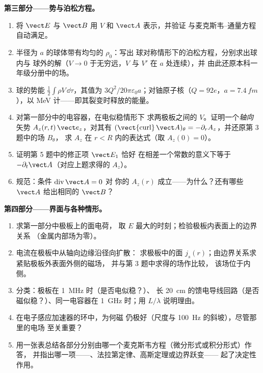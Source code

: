 \begin{problem}
\medskip
\noindent\textbf{第三部分——势与泊松方程。}
\begin{enumerate}[resume]
  \item 将 $\vect E$ 与 $\vect B$ 用 $V$ 和 $\vect A$ 表示，并验证
        与麦克斯韦–通量方程
        自动满足。
  \item 半径为 $a$ 的球体带有均匀的 $\rho_0$：写出
        球对称情形下的泊松方程，分别求出球内与
        球外的解（$V \to 0$ 于无穷远，$V$ 与 $V'$ 在 $a$ 处连续），并
        由此还原本科一年级分册中的场。
  \item 球的势能 $\tfrac12\int\rho V\,\dd\tau$，其值为
        $3Q^2/20\pi\varepsilon_0a$；对铀原子核（$Q = 92e$，$a =
        \qty{7.4}{fm}$），以 MeV 计——即其裂变时释放的能量。
  \item 对第一部分中的电容器，在电似稳情形下
        求两极板之间的 $V$。证明一个\emph{轴向}
        矢势 $A_z(r, t)\,\vect e_z$，对其有 $(\operatorname{\vect{curl}}
        \vect A)_\theta = -\partial_rA_z$，并还原第 3 题中的场 $B_\theta$，
        求 $A_z$ 在 $r < R$ 内的表达式（取 $A_z(0) = 0$）。
  \item 证明第 5 题中的修正项 $\vect E_1$ 恰好
        在相差一个常数的意义下等于 $-\partial_t\vect A$（对应上题求得的 $A_z$）。
  \item 规范：条件 $\operatorname{div}\vect A = 0$ 对
        你的 $A_z(r)$ 成立——为什么？还有哪些 $\vect A$ 给出相同的 $\vect B$？
\end{enumerate}

\medskip
\noindent\textbf{第四部分——界面与各种情形。}
\begin{enumerate}[resume]
  \item 求第一部分中极板上的面电荷，
        取 $E$ 最大的时刻；检验极板内表面上的边界关系
        （金属内部场为零）。
  \item 电流在极板中从轴向边缘沿径向扩散：
        求极板中的面 $j_s(r)$；由边界关系求
        紧贴极板外表面外侧的磁场，
        并与第 3 题中求得的场作比较，
        该场位于内侧。
  \item 分类：极板在 \qty{1}{MHz} 时（是否电似稳？）、
        长 \qty{20}{cm} 的馈电导线回路（是否磁似稳？）、同一电容器在
        \qty{1}{GHz} 时；用 $L/\lambda$ 说明理由。
  \item 在电子感应加速器的环中，为何磁
        仍极好（尺度与 \qty{100}{Hz} 的斜坡），尽管那里的电场
        至关重要？
  \item 用一张表总结各部分分别由哪一个麦克斯韦方程（微分形式或积分形式）作答，
        并指出哪一项——、法拉第定律、高斯定理或边界跃变——
        起了决定性作用。
\end{enumerate}
\end{problem}
